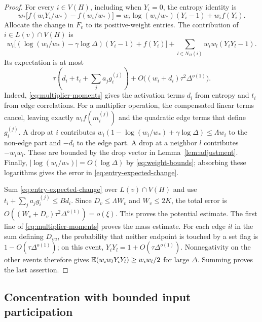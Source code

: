 \begin{proof}
For every $i\in V(H)$, including when $Y_i=0$, the entropy identity is
\begin{equation}\label{eq:entropy-change}
 w_*\bigl[f(w_iY_i/w_*)-f(w_i/w_*)\bigr]
   =w_i\log(w_i/w_*)(Y_i-1)+w_if(Y_i).
\end{equation}
Allocate the change in $F_v$ to its positive-weight entries.  The
contribution of $i\in L(v)\cap V(H)$ is
\begin{equation}\label{eq:entry-potential-change}
 w_i\bigl[(\log(w_i/w_*)-\gamma\log\Delta)(Y_i-1)+f(Y_i)\bigr]
 +\sum_{l\in N_H(i)}w_iw_l(Y_iY_l-1).
\end{equation}
Its expectation is at most
\begin{equation}\label{eq:entry-expected-change}
 \tau\left(d_i+t_i+\sum_j a_jg_i^{(j)}\right)
 +O\bigl((w_i+d_i)\tau^2\Delta^{o(1)}\bigr).
\end{equation}
Indeed, \eqref{eq:multiplier-moments} gives the activation terms $d_i$
from entropy and $t_i$ from edge correlations.  For a multiplier
operation, the compensated linear terms cancel, leaving exactly
$w_if(m_i^{(j)})$ and the quadratic edge terms that define $g_i^{(j)}$.
A drop at $i$ contributes
$w_i(1-\log(w_i/w_*)+\gamma\log\Delta)\le\Lambda w_i$ to the
non-edge part and $-d_i$ to the edge part.  A drop at a neighbor $l$
contributes $-w_iw_l$.  These are bounded by the drop vector in
Lemma~\ref{lem:adjustment}.  Finally,
$|\log(w_i/w_*)|=O(\log\Delta)$ by \eqref{eq:weight-bounds}; absorbing
these logarithms gives the error in \eqref{eq:entry-expected-change}.

Sum \eqref{eq:entry-expected-change} over $L(v)\cap V(H)$ and use
$t_i+\sum_j a_jg_i^{(j)}\le Bd_i$.  Since
$D_v\le\Lambda W_v$ and $W_v\le2K$, the total error is
$O((W_v+D_v)\tau^2\Delta^{o(1)})=o(\xi)$.  This proves the potential
estimate.  The first line of \eqref{eq:multiplier-moments} proves the
mass estimate.  For each edge $il$ in the sum defining $D_{vu}$, the
probability that neither endpoint is touched by a set flag is
$1-O(\tau\Delta^{o(1)})$; on this event,
$Y_iY_l=1+O(\tau\Delta^{o(1)})$.  Nonnegativity on the other events
therefore gives $\mathbb E(w_iw_lY_iY_l)\ge w_iw_l/2$ for large $\Delta$.
Summing proves the last assertion.
\end{proof}

\subsection{Concentration with bounded input participation}

